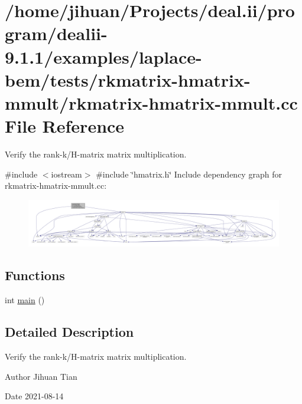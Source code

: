 \hypertarget{rkmatrix-hmatrix-mmult_8cc}{}\section{/home/jihuan/\+Projects/deal.ii/program/dealii-\/9.1.1/examples/laplace-\/bem/tests/rkmatrix-\/hmatrix-\/mmult/rkmatrix-\/hmatrix-\/mmult.cc File Reference}
\label{rkmatrix-hmatrix-mmult_8cc}


Verify the rank-\/k/\+H-\/matrix matrix multiplication.  


{\ttfamily \#include $<$iostream$>$}\newline
{\ttfamily \#include \char`\"{}hmatrix.\+h\char`\"{}}\newline
Include dependency graph for rkmatrix-\/hmatrix-\/mmult.cc\+:\nopagebreak
\begin{figure}[H]
\begin{center}
\leavevmode
\includegraphics[width=350pt]{rkmatrix-hmatrix-mmult_8cc__incl}
\end{center}
\end{figure}
\subsection*{Functions}
\begin{DoxyCompactItemize}
\item 
int \hyperlink{rkmatrix-hmatrix-mmult_8cc_ae66f6b31b5ad750f1fe042a706a4e3d4}{main} ()
\end{DoxyCompactItemize}


\subsection{Detailed Description}
Verify the rank-\/k/\+H-\/matrix matrix multiplication. 

\begin{DoxyAuthor}{Author}
Jihuan Tian 
\end{DoxyAuthor}
\begin{DoxyDate}{Date}
2021-\/08-\/14 
\end{DoxyDate}


